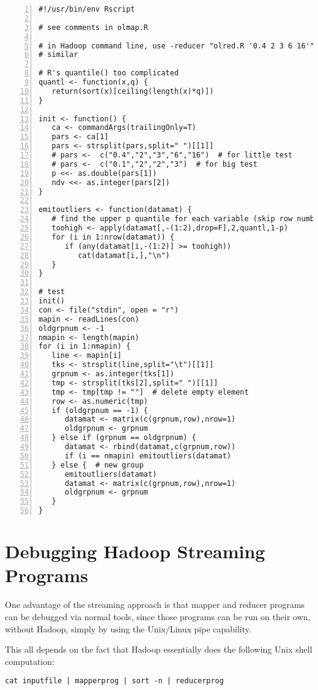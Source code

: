 \begin{lstlisting}[numbers=left]
#!/usr/bin/env Rscript

# see comments in olmap.R

# in Hadoop command line, use -reducer "olred.R '0.4 2 3 6 16'" or
# similar

# R's quantile() too complicated
quantl <- function(x,q) {
   return(sort(x)[ceiling(length(x)*q)])
}

init <- function() {
   ca <- commandArgs(trailingOnly=T)
   pars <- ca[1]
   pars <- strsplit(pars,split=" ")[[1]]
   # pars <-  c("0.4","2","3","6","16")  # for little test
   # pars <-  c("0.1","2","2","3")  # for big test
   p <<- as.double(pars[1])
   ndv <<- as.integer(pars[2])
}

emitoutliers <- function(datamat) {
   # find the upper p quantile for each variable (skip row number)
   toohigh <- apply(datamat[,-(1:2),drop=F],2,quantl,1-p)
   for (i in 1:nrow(datamat)) {
      if (any(datamat[i,-(1:2)] >= toohigh))
         cat(datamat[i,],"\n")
   }
}

# test
init()
con <- file("stdin", open = "r") 
mapin <- readLines(con)  
oldgrpnum <- -1
nmapin <- length(mapin)
for (i in 1:nmapin) {
   line <- mapin[i]
   tks <- strsplit(line,split="\t")[[1]]
   grpnum <- as.integer(tks[1])
   tmp <- strsplit(tks[2],split=" ")[[1]]
   tmp <- tmp[tmp != ""]  # delete empty element
   row <- as.numeric(tmp)
   if (oldgrpnum == -1) {
      datamat <- matrix(c(grpnum,row),nrow=1)
      oldgrpnum <- grpnum
   } else if (grpnum == oldgrpnum) {
      datamat <- rbind(datamat,c(grpnum,row))
      if (i == nmapin) emitoutliers(datamat)
   } else {  # new group
      emitoutliers(datamat)
      datamat <- matrix(c(grpnum,row),nrow=1)
      oldgrpnum <- grpnum
   }
}
\end{lstlisting}

\section{Debugging Hadoop Streaming Programs}

One advantage of the streaming approach is that mapper and reducer
programs can be debugged via normal tools, since those programs can be
run on their own, without Hadoop, simply by using the Unix/Linux pipe
capability.  

This all depends on the fact that Hadoop essentially does the following
Unix shell computation:

\begin{lstlisting}
cat inputfile | mapperprog | sort -n | reducerprog
\end{lstlisting}

